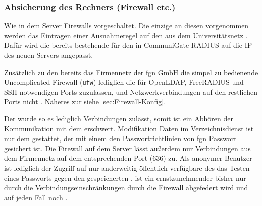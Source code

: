 \documentclass[11pt,a4paper,titlepage=firstiscover]{scrartcl} %
\begin{document}
\subsubsection{Absicherung des Rechners (Firewall etc.)}
Wie in   dem Server 
 Firewalls vorgeschaltet. Die einzige  an 
diesen vorgenommen werden  das Eintragen einer 
Ausnahmeregel auf den 
 aus dem Universitätsnetz . 
Dafür wird die bereits bestehende  für den in CommuniGate 
 RADIUS auf die IP des neuen Servers angepasst.

Zusätzlich zu den  bereits das Firmennetz der fgn GmbH 
  die simpel zu bedienende 
Uncomplicated Firewall (\texttt{ufw})  lediglich die für 
OpenLDAP, FreeRADIUS und SSH notwendigen Ports zuzulassen, und 
Netzwerkverbindungen auf den restlichen Ports nicht 
. Näheres zur  siehe 
\autoref{sec:Firewall-Konfig}.

Der  wurde so   es lediglich 
 Verbindungen zulässt, somit ist ein Abhören der 
Kommunikation mit dem  erschwert. Modifikation 
 Daten im Verzeichnisdienst ist nur dem 
 gestattet, der mit einem \tcr{-} den 
Passwortrichtlinien von fgn  Passwort 
gesichert ist. Die Firewall auf dem Server lässt außerdem nur Verbindungen aus 
dem Firmennetz  auf dem entsprechenden Port (636) zu. Als anonymer 
Benutzer ist lediglich der Zugriff auf  nur anderweitig 
öffentlich verfügbare   des 
  das Testen eines Passworts gegen 
den gespeicherten .  ist ein ernstzunehmender  bisher 
nur durch die Verbindungseinschränkungen durch die Firewall abgefedert wird und 
auf jeden Fall noch .
\end{document}
